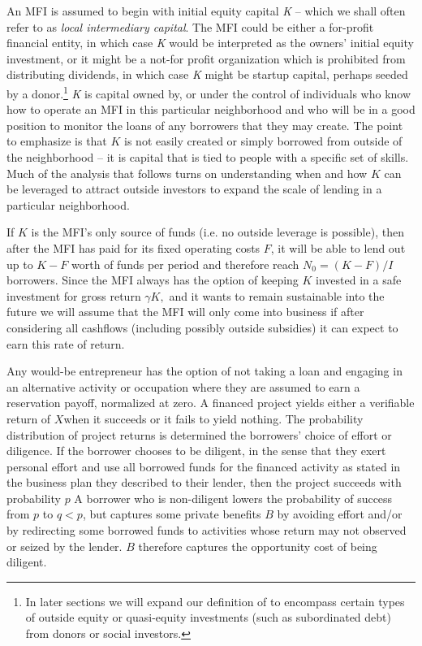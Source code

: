 \documentclass[letterpaper, 12pt]{article}
\begin{document}
An MFI is assumed to begin with initial equity capital \emph{K} -- which
we shall often refer to as \emph{local intermediary capital}. The MFI
could be either a for-profit financial entity, in which case \emph{K}
would be interpreted as the owners' initial equity investment, or it
might be a not-for profit organization which is prohibited from
distributing dividends, in which case \emph{K} might be startup capital,
perhaps seeded by a donor.\footnote{In later sections we will expand our
  definition of to encompass certain types of outside equity or
  quasi-equity investments (such as subordinated debt) from donors or
  social investors.} \emph{K} is capital owned by, or under the control
of individuals who know how to operate an MFI in this particular
neighborhood and who will be in a good position to monitor the loans of
any borrowers that they may create. The point to emphasize is that \(K\)
is not easily created or simply borrowed from outside of the
neighborhood -- it is capital that is tied to people with a specific set
of skills. Much of the analysis that follows turns on understanding when
and how \(K\) can be leveraged to attract outside investors to expand
the scale of lending in a particular neighborhood.

If \(K\) is the MFI's only source of funds (i.e. no outside leverage is
possible), then after the MFI has paid for its fixed operating costs
\(F\), it will be able to lend out up to \(K - F\) worth of funds per
period and therefore reach \(N_{0} = (K - F)/I\) borrowers. Since the
MFI always has the option of keeping \(K\) invested in a safe investment
for gross return \(\gamma K,\) and it wants to remain sustainable into
the future we will assume that the MFI will only come into business if
after considering all cashflows (including possibly outside subsidies)
it can expect to earn this rate of return.

Any would-be entrepreneur has the option of not taking a loan and
engaging in an alternative activity or occupation where they are assumed
to earn a reservation payoff, normalized at zero. A financed project
yields either a verifiable return of \(X\)when it succeeds or it fails
to yield nothing. The probability distribution of project returns is
determined the borrowers' choice of effort or diligence. If the borrower
chooses to be diligent, in the sense that they exert personal effort and
use all borrowed funds for the financed activity as stated in the
business plan they described to their lender, then the project succeeds
with probability $p$ A borrower who is non-diligent lowers the
probability of success from \(p\) to \(q < p\), but captures some
private benefits \(B\) by avoiding effort and/or by redirecting some
borrowed funds to activities whose return may not observed or seized by
the lender. \(B\) therefore captures the opportunity cost of being
diligent.
\end{document}

